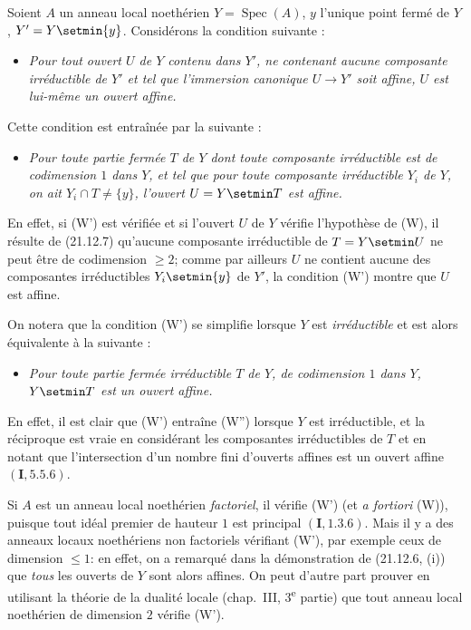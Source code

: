 \begin{env}[21.12.8]
\label{IV.21.12.8}
Soient $A$ un anneau local noethérien $Y=\operatorname{Spec}(A)$, $y$ l'unique point
fermé de $Y$, $Y'=Y\setmin\{y\}$. Considérons la condition suivante :
\begin{itemize}
  \item[\textup{(W)}] \emph{Pour tout ouvert $U$ de $Y$ contenu dans $Y'$, ne
  contenant aucune composante irréductible de $Y'$ et tel que l'immersion canonique
  $U\to Y'$ soit affine, $U$ est lui-même un ouvert affine.}
\end{itemize}

Cette condition est entraînée par la suivante :
\begin{itemize}
  \item[\textup{(W')}] \emph{Pour toute partie fermée $T$ de $Y$ dont toute composante
  irréductible est de codimension $1$ dans $Y$, et tel que pour toute composante
  irréductible $Y_i$ de $Y$, on ait $Y_i\cap T\ne\{y\}$, l'ouvert $U=Y\setmin T$ est affine.}
\end{itemize}

En effet, si (W') est vérifiée et si l'ouvert $U$ de $Y$ vérifie l'hypothèse de (W), il
résulte de (21.12.7) qu'aucune composante irréductible de $T=Y\setmin U$ ne peut être de
codimension $\geq2$; comme par ailleurs $U$ ne contient aucune des composantes
irréductibles $Y_i\setmin\{y\}$ de $Y'$, la condition (W') montre que $U$ est affine.

On notera que la condition (W') se simplifie lorsque $Y$ est \emph{irréductible} et est
alors équivalente à la suivante :
\begin{itemize}
  \item[\textup{(W'')}] \emph{Pour toute partie fermée irréductible $T$ de $Y$, de
  codimension $1$ dans $Y$, $Y\setmin T$ est un ouvert affine.}
\end{itemize}

En effet, il est clair que (W') entraîne (W'') lorsque $Y$ est irréductible, et la
réciproque est vraie en considérant les composantes irréductibles de $T$ et en notant
que l'intersection d'un nombre fini d'ouverts affines est un ouvert affine
$(\mathbf I, 5.5.6)$.
\end{env}

\begin{examples}[21.12.9]
\label{IV.21.12.9}
Si $A$ est un anneau local noethérien \emph{factoriel}, il vérifie (W') (et
\emph{a fortiori} (W)), puisque tout idéal premier de hauteur $1$ est principal
$(\mathbf I, 1.3.6)$. Mais il y a des anneaux locaux noethériens non factoriels
vérifiant (W'), par exemple ceux de dimension $\leq1$: en effet, on a remarqué dans la
démonstration de (21.12.6, (i)) que \emph{tous} les ouverts de $Y$ sont alors affines.
On peut d'autre part prouver en utilisant la théorie de la dualité locale (chap.~III,
3\textsuperscript{e} partie) que tout anneau local noethérien de dimension $2$ vérifie
(W').
\end{examples}

